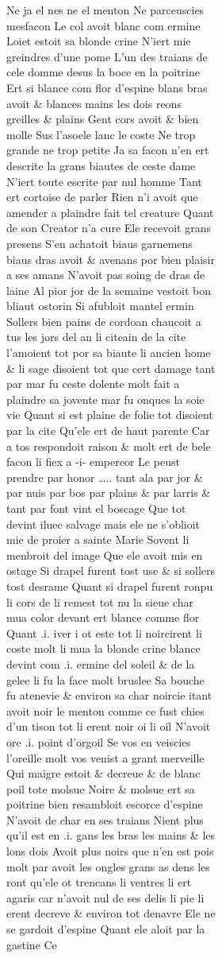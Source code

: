 \documentclass[
  letterpaper,
  DIV=11,
  numbers=noendperiod,
  oneside]{scrreprt}
\begin{document}
\begin{figure}
\begin{figure}
\begin{figure}
\begin{minipage}{0.20\linewidth}
{Ne ja} el nes {ne} el menton {Ne} parceuscies mesfacon Le col avoit
{blanc com ermine} Loiet estoit sa {blonde} crine {{N'iert mie
greindres} d'une pome} {L'un des traians de cele domme} desus la boce en
la poitrine Ert si {blance com flor d'espine} {blans bras} avoit \&
{blances mains} les dois reons greilles \& plains Gent cors avoit \&
bien molle Sus l'asoele lanc le coste {Ne trop grande ne trop petite}
{Ja} sa facon {n'}en ert descrite la grans biautes de ceste dame
{N'}iert toute escrite par {nul} homme Tant ert cortoise de parler {Rien
n'}i avoit que amender a plaindre fait tel creature Quant de son Creator
{n'}a cure Ele recevoit grans presens S'en achatoit biaus garnemens
biaus dras avoit \& avenans por bien plaisir a ses amans {N'}avoit {pas}
soing de dras de laine Al pior jor de la semaine vestoit bon bliaut
{ostorin} Si afubloit mantel ermin Sollers {bien pains} de cordoan
chaucoit a tus les jors del an li citeain de la cite l'amoient tot por
sa biaute li ancien home \& li sage disoient tot que cert damage tant
par mar fu ceste dolente molt fait a plaindre sa jovente mar fu onques
la soie vie Quant si est plaine de folie tot disoient par la cite Qu'ele
ert de haut parente Car a tos respondoit raison \& molt ert de bele
facon li fiex a -i- empereor Le peust prendre par honor \ldots.. tant
ala par jor \& par nuis {par bos par plains \& par larris} \& tant par
font vint el boscage Que tot devint iluec salvage mais ele {ne}
s'oblioit {mie} de proier a sainte Marie Sovent li menbroit del image
Que ele avoit mis en ostage Si drapel furent tost use \& si sollers tost
desrame Quant si drapel furent ronpu li cors de li remest tot nu la
sieue char {mua color} devant ert {blance comme flor} Quant .i. iver i
ot este tot li {noircirent} li coste molt li mua la {blonde} crine
{blance devint com .i. ermine} {del soleil \& de la gelee} {li fu la
face molt {bruslee}} Sa bouche fu atenevie \& environ sa char {noircie}
itant avoit {noir} le menton {comme ce fust chies d'un tison} tot li
erent {noir} oi li oil {N'}avoit ore {.i. point d'}orgoil Se vos en
veiscies l'oreille molt vos venist a grant merveille Qui maigre estoit
\& decreue \& de {blanc} poil tote molsue {Noire} \& molsue ert sa
poitrine bien resambloit escorce d'espine {N'}avoit {de} char en ses
traians {Nient plus} qu'il est en .i. gans les bras les mains \& les
lons dois Avoit {plus noirs que n'en est pois} molt par avoit les ongles
grans {as dens les ront qu'ele ot trencans} li ventres li ert {agaris}
{car {n'avoit nul} de ses delis} li pie li erent decreve \& environ tot
denavre Ele {ne} se gardoit d'espine Quant ele aloit par la gastine Ce

\end{minipage}
\end{figure}
\end{figure}
\end{figure}
\end{document}
